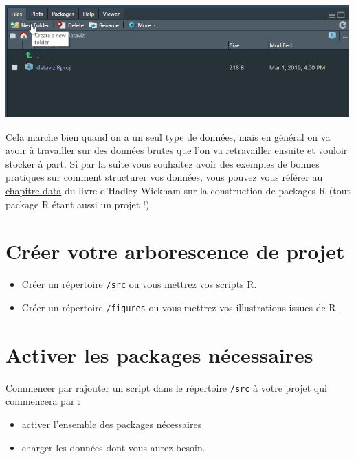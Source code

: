 \documentclass[]{book}
\providecommand{\tightlist}{%
  \setlength{\itemsep}{0pt}\setlength{\parskip}{0pt}}
\begin{document}
\includegraphics[width=5.20833in,height=\textheight]{images/creerprojet3.png}

Cela marche bien quand on a un seul type de données, mais en général on va avoir à travailler sur des données brutes que l'on va retravailler ensuite et vouloir stocker à part. Si par la suite vous souhaitez avoir des exemples de bonnes pratiques sur comment structurer vos données, vous pouvez vous référer au \href{http://r-pkgs.had.co.nz/data.html}{chapitre data} du livre d'Hadley Wickham sur la construction de packages R (tout package R étant aussi un projet !).

\hypertarget{creer-votre-arborescence-de-projet}{%
\section{Créer votre arborescence de projet}\label{creer-votre-arborescence-de-projet}}

\begin{itemize}
\tightlist
\item
  Créer un répertoire \texttt{/src} ou vous mettrez vos scripts R.
\item
  Créer un répertoire \texttt{/figures} ou vous mettrez vos illustrations issues de R.
\end{itemize}

\hypertarget{activer-les-packages-necessaires}{%
\section{Activer les packages nécessaires}\label{activer-les-packages-necessaires}}

Commencer par rajouter un script dans le répertoire \texttt{/src} à votre projet qui commencera par :

\begin{itemize}
\item
  activer l'ensemble des packages nécessaires
\item
  charger les données dont vous aurez besoin.
\end{itemize}
\end{document}
